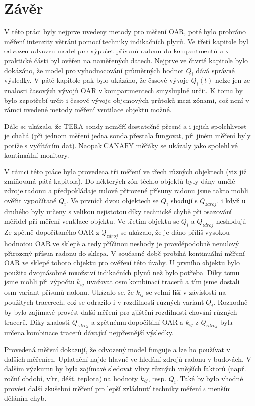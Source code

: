 \chapter{Závěr}
V této práci byly nejprve uvedeny metody pro měření OAR, poté bylo probráno měření intenzity větrání pomocí techniky indikačních plynů. Ve třetí kapitole byl odvozen odvozen model pro výpočet přísunů radonu do kompartmentů a v praktické části byl ověřen na naměřených datech. Nejprve ve čtvrté kapitole bylo dokázáno, že model pro vyhodnocování průměrných hodnot $Q_i$ dává správné výsledky. V páté kapitole pak bylo ukázáno, že časové vývoje $Q_i(t)$ nelze jen ze znalosti časových vývojů OAR v kompartmentech smysluplně určit. K tomu by bylo zapotřebí určit i časové vývoje objemových průtoků mezi zónami, což není v rámci uvedené metody měření ventilace objektu možné.

Dále se ukázalo, že TERA sondy neměří dostatečně přesně a i jejich spolehlivost je chabá (při jednom měření jedna sonda přestala fungovat, při jiném měření byly potíže s vyčítáním dat). Naopak CANARY měřáky se ukázaly jako spolehlivé kontinuální monitory.

V rámci této práce byla provedena tři měření ve třech různých objektech (viz již zmiňovaná pátá kapitola). Do některých zón těchto objektů byly dány umělé zdroje radonu a předpokládaje nulové přirozené přísuny radonu jsme takto mohli ověřit vypočítané $Q_i$. Ve prvních dvou objektech se $Q_i$ shodují s $Q_{zdroj}$, i když u druhého byly určeny s velikou nejistotou díky technické chybě při osazování měřidel při měření ventilace objektu. Ve třetím objektu se $Q_i$ a $Q_{zdroj}$ neshodují. Ze zpětně dopočítaného OAR z $Q_{zdroj}$ se ukázalo, že je dáno příliš vysokou hodnotou OAR ve sklepě a tedy příčinou neshody je pravděpodobně nenulový přirozený přísun radonu do sklepa. V současné době probíhá kontinuální měření OAR ve sklepě tohoto objektu pro ověření
této úvahy. U prvního objektu bylo použito dvojnásobné množství indikačních plynů než bylo potřeba. Díky tomu jsme mohli při výpočtu $k_{ij}$ uvažovat osm kombinací tracerů a tím jsme dostali osm variant přísunů radonu. Ukázalo se, že $k_{ij}$ se velmi liší v závislosti na použitých tracerech, což se odrazilo i v rozdílnosti různých variant $Q_i$. Rozhodně by bylo zajímavé provést další měření pro zjištění rozdílnosti chování různých tracerů. Díky znalosti $Q_{zdroj}$ a zpětnému dopočítání OAR a $k_{ij}$ z $Q_{zdroj}$ byla určena kombinace tracerů dávající nejpřesnější výsledky.

Provedená měření dokazují, že odvozený model funguje a lze ho používat v dalších měřeních. Uplatnění najde hlavně ve hledání zdrojů radonu v budovách. V dalším výzkumu by bylo zajímavé sledovat vlivy různých vnějších faktorů (např. roční období, vítr, déšť, teplota) na hodnoty $k_{ij}$, resp. $Q_i$. Také by bylo vhodné provést další zkušební měření pro lepší zvládnutí techniky měření s menším děláním chyb.

